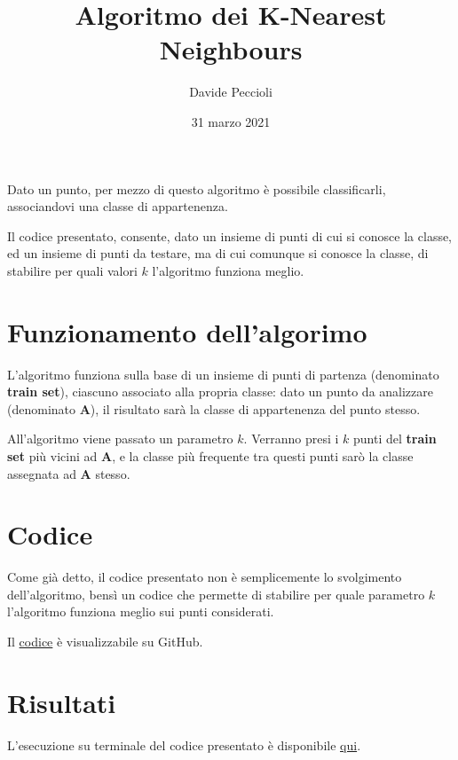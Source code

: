 \documentclass[a4paper]{article}
\title{Algoritmo dei K-Nearest Neighbours}
\date{31 marzo 2021}
\author{Davide Peccioli}
\begin{document}
\maketitle

Dato un punto, per mezzo di questo algoritmo è possibile classificarli, associandovi una classe di appartenenza.

Il codice presentato, consente, dato un insieme di punti di cui si conosce la classe, ed un insieme di punti da testare, ma di cui comunque si conosce la classe, di stabilire per quali valori $k$ l'algoritmo funziona meglio.

\section{Funzionamento dell'algorimo}

L'algoritmo funziona sulla base di un insieme di punti di partenza (denominato \textbf{train set}), ciascuno associato alla propria classe: dato un punto da analizzare (denominato \textbf{A}), il risultato sarà la classe di appartenenza del punto stesso.

All'algoritmo viene passato un parametro $k$. Verranno presi i $k$ punti del \textbf{train set} più vicini ad \textbf{A}, e la classe più frequente tra questi punti sarò la classe assegnata ad \textbf{A} stesso.

\section{Codice}

Come già detto, il codice presentato non è semplicemente lo svolgimento dell'algoritmo, bensì un codice che permette di stabilire per quale parametro $k$ l'algoritmo funziona meglio sui punti considerati.

Il \href{https://github.com/DavideP02/Octave_KNN_Peccioli5H/blob/main/KNN.m}{codice} è visualizzabile su GitHub.

\section{Risultati}

L'esecuzione su terminale del codice presentato è disponibile \href{https://youtu.be/Dq0btd1xUEI}{qui}.
\end{document}
